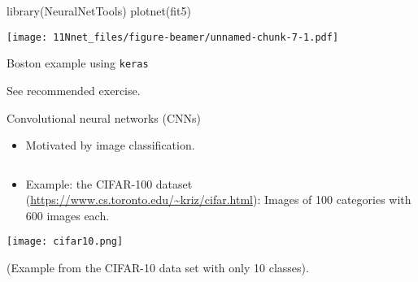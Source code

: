 \documentclass[
  10pt,
  ignorenonframetext,
]{beamer}
\newenvironment{Shaded}{\begin{snugshade}}{\end{snugshade}}
\newcommand{\FunctionTok}[1]{\textcolor[rgb]{0.00,0.00,0.00}{#1}}
\newcommand{\NormalTok}[1]{#1}
\providecommand{\tightlist}{%
  \setlength{\itemsep}{0pt}\setlength{\parskip}{0pt}}
\begin{document}
\begin{frame}[fragile]
\begin{Shaded}
\begin{Highlighting}[]
\FunctionTok{library}\NormalTok{(NeuralNetTools)}
\FunctionTok{plotnet}\NormalTok{(fit5)}
\end{Highlighting}
\end{Shaded}

\texttt{[image: 11Nnet\_files/figure-beamer/unnamed-chunk-7-1.pdf]}
\end{frame}

\begin{frame}[fragile]
\begin{block}{Boston example using \texttt{keras}}
\protect\hypertarget{boston-example-using-keras}{}
\(~\)

See recommended exercise.
\end{block}
\end{frame}

\begin{frame}{Convolutional neural networks (CNNs)}
\protect\hypertarget{convolutional-neural-networks-cnns}{}
\(~\)

\begin{itemize}
\tightlist
\item
  Motivated by image classification.
\end{itemize}

\(~\)

\begin{itemize}
\tightlist
\item
  Example: the CIFAR-100 dataset
  (\url{https://www.cs.toronto.edu/~kriz/cifar.html}): Images of 100
  categories with 600 images each.
\end{itemize}

\centering

\texttt{[image: cifar10.png]}

\flushleft
\scriptsize

(Example from the CIFAR-10 data set with only 10 classes).
\end{frame}
\end{document}
